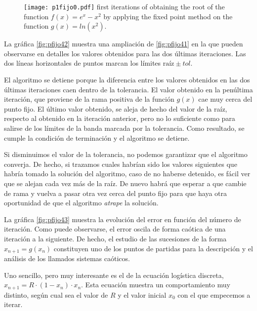 \begin{figure}[h]
	\centering
	\texttt{[image: p1fijo0.pdf]}
	 {first iterations of obtaining the root of the function $f(x)=e^x-x^2$ by applying the fixed point method on the function $g(x)=ln(x^2)$.}
	\label{fig:pfijo03}
\end{figure}

\begin{paracol}{2}  
 La gráfica \ref{fig:pfijo42} muestra una ampliación de \ref{fig:pfijo41} en la que pueden observarse en detalles los valores obtenidos para las dos últimas iteraciones. Las dos líneas horizontales de puntos marcan los límites $\text{raíz}\pm tol$. 
 
 El algoritmo se detiene porque la diferencia entre los valores obtenidos en las dos últimas iteraciones caen dentro de la tolerancia. El valor obtenido en la penúltima iteración, que proviene de la rama positiva de la función $g(x)$ cae muy cerca del punto fijo. El último valor obtenido, se aleja de hecho del valor de la raíz, respecto al obtenido en la iteración anterior, pero no lo suficiente como para salirse de los límites de la banda marcada por la tolerancia. Como resultado, se cumple la condición de terminación y el algoritmo se detiene.  
 
 Si disminuimos el valor de la tolerancia, no podemos garantizar que el algoritmo converja. De hecho, si trazamos cuales habrían sido los valores siguientes que habría tomado la solución del algoritmo, caso de no haberse detenido, es fácil ver que se alejan cada vez más de la raíz.  De nuevo habrá que esperar a que cambie de rama y vuelva  a pasar otra vez cerca del punto fijo para que haya otra oportunidad de que el algoritmo \emph{atrape} la solución.
 
  La gráfica \ref{fig:pfijo43} muestra la evolución del error en función del número de iteración. Como puede observarse, el error oscila de forma caótica de una iteración a la siguiente. De hecho, el estudio de las sucesiones de la forma $x_{n+1}=g(x_n)$ constituyen uno de los puntos de partidas para la descripción y el análisis de los llamados sistemas caóticos. 

Uno sencillo, pero muy interesante es el de la ecuación logística discreta, $x_{n+1}=R\cdot (1-x_n)\cdot x_n$. Esta ecuación muestra un comportamiento muy distinto, según cual sea el valor de $R$ y el valor inicial $x_0$ con el que empecemos a iterar.
  

\end{paracol}
